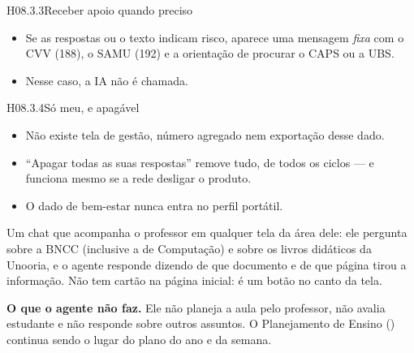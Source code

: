 \begin{historia}{H08.3.3}{Receber apoio quando preciso}{\pronto}
\aceite
\begin{itemize}
  \item Se as respostas ou o texto indicam risco, aparece uma mensagem
    \emph{fixa} com o CVV (188), o SAMU (192) e a orientação de procurar o
    CAPS ou a UBS.
  \item Nesse caso, a IA não é chamada.
\end{itemize}
\end{historia}

\begin{historia}{H08.3.4}{Só meu, e apagável}{\pronto}
\aceite
\begin{itemize}
  \item Não existe tela de gestão, número agregado nem exportação desse dado.
  \item \enquote{Apagar todas as suas respostas} remove tudo, de todos os
    ciclos --- e funciona mesmo se a rede desligar o produto.
  \item O dado de bem-estar nunca entra no perfil portátil.
\end{itemize}
\end{historia}


Um chat que acompanha o professor em qualquer tela da área dele: ele pergunta
sobre a BNCC (inclusive a de Computação) e sobre os livros didáticos da
Unooria, e o agente responde dizendo de que documento e de que página tirou a
informação. Não tem cartão na página inicial: é um botão no canto da tela.

\begin{nota}
\textbf{O que o agente não faz.} Ele não planeja a aula pelo professor, não
avalia estudante e não responde sobre outros assuntos. O Planejamento de Ensino
() continua sendo o lugar do plano do ano e da semana.
\end{nota}

